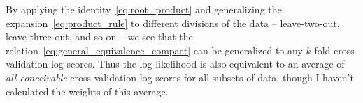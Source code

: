 \documentclass[\ifafour a4paper,12pt,\else a5paper,10pt,\fi%
onecolumn,oneside,article,%
british%
]{memoir}
\theoremstyle{remark}
\theoremstyle{innote}
\renewcommand*{\|}[1][]{\nonscript\,#1\vert\nonscript\;\mathopen{}}
\begin{document}
By applying the identity~\eqref{eq:root_product} and generalizing the
expansion~\eqref{eq:product_rule} to different divisions of the data --
leave-two-out, leave-three-out, and so on -- we see that the
relation~\eqref{eq:general_equivalence_compact} can be generalized to any
$k$-fold cross-validation log-scores. Thus the log-likelihood is also
equivalent to an average of \emph{all conceivable} cross-validation
log-scores for all subsets of data, though I haven't calculated the weights
of this average.


\end{document}

